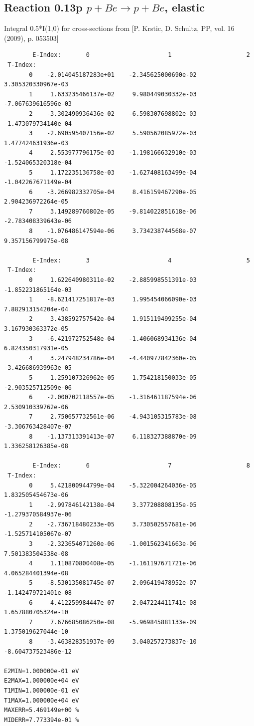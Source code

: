 \documentclass[12pt,dvipdfmx]{article}
\begin{document}
\subsection{
Reaction 0.13p  $p + Be \rightarrow p + Be$, elastic}

Integral 0.5*I(1,0) for cross-sections from [P. Krstic, D. Schultz, PP, vol. 16 (2009), p. 053503]

\begin{small}\begin{verbatim}
        E-Index:       0                      1                     2
 T-Index:
       0    -2.014045187283e+01    -2.345625000690e-02     3.305320330967e-03
       1     1.633235466137e-02     9.980449030332e-03    -7.067639616596e-03
       2    -3.302490936436e-02    -6.598307698802e-03    -1.473079734140e-04
       3    -2.690595407156e-02     5.590562085972e-03     1.477424631936e-03
       4     2.553977796175e-03    -1.198166632910e-03    -1.524065320318e-04
       5     1.172235136758e-03    -1.627408163499e-04    -1.042267671149e-04
       6    -3.266982332705e-04     8.416159467290e-05     2.904236972264e-05
       7     3.149289760802e-05    -9.814022851618e-06    -2.783408339643e-06
       8    -1.076486147594e-06     3.734238744568e-07     9.357156799975e-08

        E-Index:       3                      4                     5
 T-Index:
       0     1.622640980311e-02    -2.885998551391e-03    -1.852231865164e-03
       1    -8.621417251817e-03     1.995454066090e-03     7.882913154204e-04
       2     3.438592757542e-04     1.915119499255e-04     3.167930363372e-05
       3    -6.421972752548e-04    -1.406068934136e-04     6.824350317931e-05
       4     3.247948234786e-04    -4.440977842360e-05    -3.426686939963e-05
       5     1.259107326962e-05     1.754218150033e-05    -2.903525712509e-06
       6    -2.000702118557e-05    -1.316461187594e-06     2.530910339762e-06
       7     2.750657732561e-06    -4.943105315783e-08    -3.306763428407e-07
       8    -1.137313391413e-07     6.118327388870e-09     1.336258126385e-08

        E-Index:       6                      7                     8
 T-Index:
       0     5.421800944799e-04    -5.322004264036e-05     1.832505454673e-06
       1    -2.997846142138e-04     3.377208808135e-05    -1.279370584937e-06
       2    -2.736718480233e-05     3.730502557681e-06    -1.525714105067e-07
       3    -2.323654071260e-06    -1.001562341663e-06     7.501383504538e-08
       4     1.110870800408e-05    -1.161197671721e-06     4.065284401394e-08
       5    -8.530135081745e-07     2.096419478952e-07    -1.142479721401e-08
       6    -4.412259984447e-07     2.047224411741e-08     1.657880705324e-10
       7     7.676685086250e-08    -5.969845881133e-09     1.375019627044e-10
       8    -3.463828351937e-09     3.040257273837e-10    -8.604737523486e-12

E2MIN=1.000000e-01 eV
E2MAX=1.000000e+04 eV
T1MIN=1.000000e-01 eV
T1MAX=1.000000e+04 eV
MAXERR=5.469149e+00 %
MIDERR=7.773394e-01 %
\end{verbatim}\end{small}
\newpage
\end{document}
